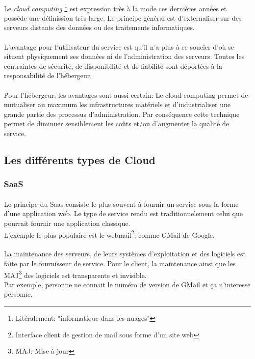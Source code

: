 \paragraph*{}
Le \emph{cloud computing} \footnote{Litéralement: "informatique dans les nuages"} est expression
très à la mode ces dernières années et possède une définission très large.
Le principe général est d'externaliser sur des serveurs distants des données ou
des traitements informatiques.

\paragraph*{}
L'avantage pour l'utilisateur du service est qu'il n'a plus à ce soucier d'où se situent physiquement
ses données ni de l'administration des serveurs. Toutes les contraintes de sécurité, de disponibilité
et de fiabilité sont déportées à la responsabilité de l'hébergeur.

\paragraph*{}
Pour l'hébergeur, les avantages sont aussi certain: Le cloud computing permet de mutualiser au maximum
les infrastructures matériels et d'industrialiser une grande partie des processus d'administration.
Par conséquence cette technique permet de diminuer sensiblement les coûts et/ou d'augmenter la qualité
de service.

\subsection{Les différents types de Cloud}

\subsubsection{SaaS}
\paragraph*{}
Le principe du Saas consiste le plus souvent à fournir un service sous la forme d'une application web.
Le type de service rendu est traditionnelement celui que pourrait fournir une application classique.
\\
L'exemple le plus populaire est le webmail\footnote{Interface client de gestion de mail sous forme d'un site web}, comme GMail de Google.

\paragraph*{}
La maintenance des serveurs, de leurs systèmes d'exploitation et des logiciels est faite par le fournisseur de service.
Pour le client, la maintenance ainsi que les MAJ\footnote{MAJ: Mise à jour} des logiciels est transparente et invisible.
\\
Par exemple, personne ne connait le numéro de version de GMail et ça n'interesse personne.

